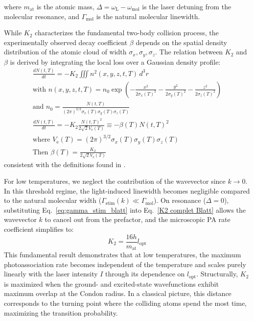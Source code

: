 where $m_{\text{at}}$ is the atomic mass, $\Delta = \omega_{\text{L}} - \omega_{\text{mol}}$ is the laser detuning from the molecular resonance, and $\Gamma_{\text{mol}}$ is the natural molecular linewidth.

While $K_2$ characterizes the fundamental two-body collision process, the experimentally observed decay coefficient $\beta$ depends on the spatial density distribution of the atomic cloud of width $\sigma_x, 
\sigma_y, \sigma_z$. The relation between $K_2$ and $\beta$ is derived by integrating the local loss over a Gaussian density profile:
\begin{gather}
\frac{dN(t,T)}{dt} = -K_2 \iiint n^2(x,y,z,t,T) \, d^3r \label{eq:3.24} \\[1.5ex]
\text{with } n(x,y,z,t,T) = n_0 \exp\left( -\frac{x^2}{2\sigma_x(T)^2} - \frac{y^2}{2\sigma_y(T)^2} - \frac{z^2}{2\sigma_z(T)^2} \right) \label{eq:3.25} \\[1.5ex]
\text{and } n_0 = \frac{N(t,T)}{(2\pi)^{3/2}\sigma_x(T)\sigma_y(T)\sigma_z(T)} \label{eq:3.25bis} \\[1.5ex]
\frac{dN(t,T)}{dt} = -K_2 \frac{N(t,T)^2}{2\sqrt{2}V_{\text{e}}(T)} \equiv -\beta(T) N(t,T)^2 \label{eq:3.26} \\[1.5ex]
\text{where } V_{\text{e}}(T) = (2\pi)^{3/2} \sigma_x(T) \sigma_y(T) \sigma_z(T) \label{eq:3.27} \\[1.5ex]
\text{Then } \beta(T) = \frac{K_2}{2\sqrt{2}V_{\text{e}}(T)} \label{eq:3.28}
\end{gather}
consistent with the definitions found in \cite{han_photoassociation_2018}.

For low temperatures, we neglect the contribution of the wavevector since $k \to 0$. In this threshold regime, the light-induced linewidth becomes negligible compared to the natural molecular width 
($\Gamma_{\text{stim}}(k) \ll \Gamma_{\text{mol}}$). On resonance ($\Delta = 0$), substituting Eq.~\ref{eq:gamma_stim_blatt} into Eq.~\ref{K2 complet Blatt} allows the wavevector $k$ to cancel out from the 
prefactor, and the microscopic PA rate coefficient simplifies to:
\begin{equation}
    K_2 = \frac{16h}{m_{\text{at}}}l_{\text{opt}}
    \label{K2 et lopt}
\end{equation}
This fundamental result demonstrates that at low temperatures, the maximum photoassociation rate becomes independent of the temperature and scales purely linearly with the laser intensity $I$ through its dependence 
on $l_{\text{opt}}$. Structurally, $K_2$ is maximized when the ground- and excited-state wavefunctions exhibit maximum overlap at the Condon radius. In a classical picture, this distance corresponds to the turning 
point where the colliding atoms spend the most time, maximizing the transition probability.

